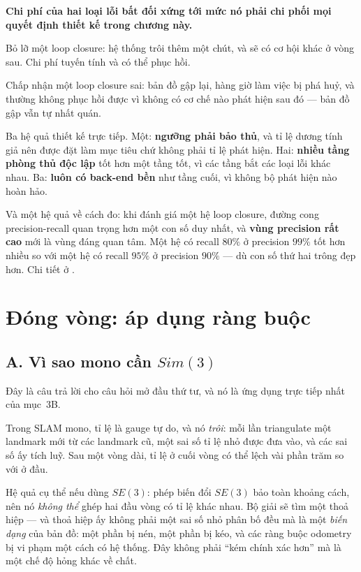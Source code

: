 \documentclass[../../vslam.tex]{subfiles}
\begin{document}
\begin{cannho}
\textbf{Chi phí của hai loại lỗi bất đối xứng tới mức nó phải chi phối mọi quyết định thiết kế trong chương này.}

Bỏ lỡ một loop closure: hệ thống trôi thêm một chút, và sẽ có cơ hội khác ở vòng sau. Chi phí tuyến tính và có thể phục hồi.

Chấp nhận một loop closure sai: bản đồ gập lại, hàng giờ làm việc bị phá huỷ, và thường không phục hồi được vì không có cơ chế nào phát hiện sau đó --- bản đồ gập vẫn tự nhất quán.

Ba hệ quả thiết kế trực tiếp. Một: \textbf{ngưỡng phải bảo thủ}, và tỉ lệ dương tính giả nên được đặt làm mục tiêu chứ không phải tỉ lệ phát hiện. Hai: \textbf{nhiều tầng phòng thủ độc lập} tốt hơn một tầng tốt, vì các tầng bắt các loại lỗi khác nhau. Ba: \textbf{luôn có back-end bền} như tầng cuối, vì không bộ phát hiện nào hoàn hảo.

Và một hệ quả về cách đo: khi đánh giá một hệ loop closure, đường cong precision-recall quan trọng hơn một con số duy nhất, và \textbf{vùng precision rất cao} mới là vùng đáng quan tâm. Một hệ có recall \(80\%\) ở precision \(99\%\) tốt hơn nhiều so với một hệ có recall \(95\%\) ở precision \(90\%\) --- dù con số thứ hai trông đẹp hơn. Chi tiết ở .
\end{cannho}

\section{Đóng vòng: áp dụng ràng buộc}

\subsection{A. Vì sao mono cần \(Sim(3)\)}

Đây là câu trả lời cho câu hỏi mở đầu thứ tư, và nó là ứng dụng trực tiếp nhất của  mục~3B.

Trong SLAM mono, tỉ lệ là gauge tự do, và nó \emph{trôi}: mỗi lần triangulate một landmark mới từ các landmark cũ, một sai số tỉ lệ nhỏ được đưa vào, và các sai số ấy tích luỹ. Sau một vòng dài, tỉ lệ ở cuối vòng có thể lệch vài phần trăm so với ở đầu.

Hệ quả cụ thể nếu dùng \(SE(3)\): phép biến đổi \(SE(3)\) bảo toàn khoảng cách, nên nó \emph{không thể} ghép hai đầu vòng có tỉ lệ khác nhau. Bộ giải sẽ tìm một thoả hiệp --- và thoả hiệp ấy không phải một sai số nhỏ phân bố đều mà là một \emph{biến dạng} của bản đồ: một phần bị nén, một phần bị kéo, và các ràng buộc odometry bị vi phạm một cách có hệ thống. Đây không phải ``kém chính xác hơn'' mà là một chế độ hỏng khác về chất.
\end{document}
